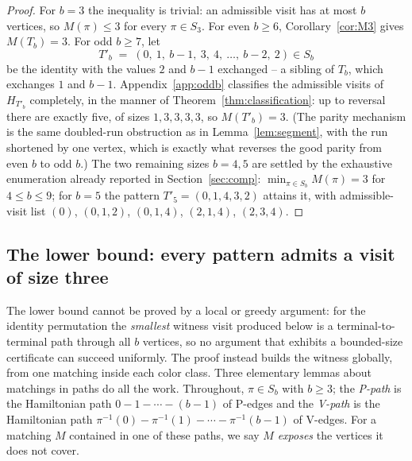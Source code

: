 \documentclass[11pt]{article}
\theoremstyle{definition}
\newcommand{\inv}[1]{#1^{-1}}
\begin{document}
\begin{proof}
For $b = 3$ the inequality is trivial: an admissible visit has at most $b$ vertices,
so $M(\pi) \le 3$ for every $\pi \in S_3$. For even $b \ge 6$,
Corollary~\ref{cor:M3} gives $M(T_b) = 3$. For odd $b \ge 7$, let
\[
  T'_b \;=\; (0,\ 1,\ b{-}1,\ 3,\ 4,\ \dots,\ b{-}2,\ 2) \in S_b
\]
be the identity with the values $2$ and $b-1$ exchanged -- a sibling of $T_b$, which
exchanges $1$ and $b-1$. Appendix~\ref{app:oddb} classifies the admissible visits of
$H_{T'_b}$ completely, in the manner of Theorem~\ref{thm:classification}: up to
reversal there are exactly five, of sizes $1, 3, 3, 3, 3$, so $M(T'_b) = 3$. (The
parity mechanism is the same doubled-run obstruction as in
Lemma~\ref{lem:segment}, with the run shortened by one vertex, which is exactly what
reverses the good parity from even $b$ to odd $b$.) The two remaining sizes $b = 4, 5$
are settled by the exhaustive enumeration already reported in
Section~\ref{sec:comp}: $\min_{\pi \in S_b} M(\pi) = 3$ for $4 \le b \le 9$; for $b=5$
the pattern $T'_5 = (0,1,4,3,2)$ attains it, with admissible-visit list
$(0)$, $(0,1,2)$, $(0,1,4)$, $(2,1,4)$, $(2,3,4)$.
\end{proof}

\subsection{The lower bound: every pattern admits a visit of size three}

The lower bound cannot be proved by a local or greedy argument: for the identity
permutation the \emph{smallest} witness visit produced below is a
terminal-to-terminal path through all $b$ vertices, so no argument that exhibits a
bounded-size certificate can succeed uniformly. The proof instead builds the witness
globally, from one matching inside each color class. Three elementary lemmas about
matchings in paths do all the work. Throughout, $\pi \in S_b$ with $b \ge 3$; the
\emph{P-path} is the Hamiltonian path $0 - 1 - \cdots - (b-1)$ of P-edges and the
\emph{V-path} is the Hamiltonian path $\inv\pi(0) - \inv\pi(1) - \cdots - \inv\pi(b-1)$
of V-edges. For a matching $M$ contained in one of these paths, we say $M$
\emph{exposes} the vertices it does not cover.
\end{document}
